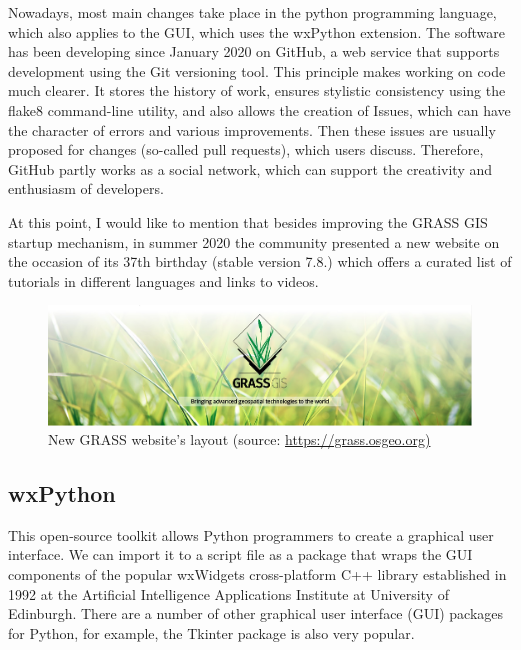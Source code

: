 \documentclass[a4paper,10pt,twoside]{article}
\begin{document}
Nowadays, most main changes take place in the python programming language, which also applies to the GUI, which uses the wxPython extension. The software has been developing since January 2020 on GitHub, a web service that supports development using the Git versioning tool. This principle makes working on code much clearer. It stores the history of work, ensures stylistic consistency using the flake8 command-line utility, and also allows the creation of Issues, which can have the character of errors and various improvements. Then these issues are usually proposed for changes (so-called pull requests), which users discuss. Therefore, GitHub partly works as a social network, which can support the creativity and enthusiasm of developers.

At this point, I would like to mention that besides improving the GRASS GIS startup mechanism, in summer 2020 the community presented a new website on the occasion of its 37th birthday (stable version 7.8.) which offers a curated list of tutorials in different languages and links to videos.

\vspace{0.3cm}
\begin{figure}[hbt!]
\begin{center}
\includegraphics[width=15cm]{pictures/grass_gis.png} 
\caption[New GRASS website's layout]{New GRASS website's layout (source: \url{https://grass.osgeo.org)}}
\label{fig:grass_gis}
\end{center}
\end{figure}

\subsection{wxPython}
\noindent
\large

\noindent This open-source toolkit allows Python programmers to create a graphical user interface. We can import it to a script file as a package that wraps the GUI components of the popular wxWidgets cross-platform C++ library established in 1992 at the Artificial Intelligence Applications Institute at University of Edinburgh. There are a number of other graphical user interface (GUI) packages for Python, for example, the Tkinter package is also very popular.
\end{document}
